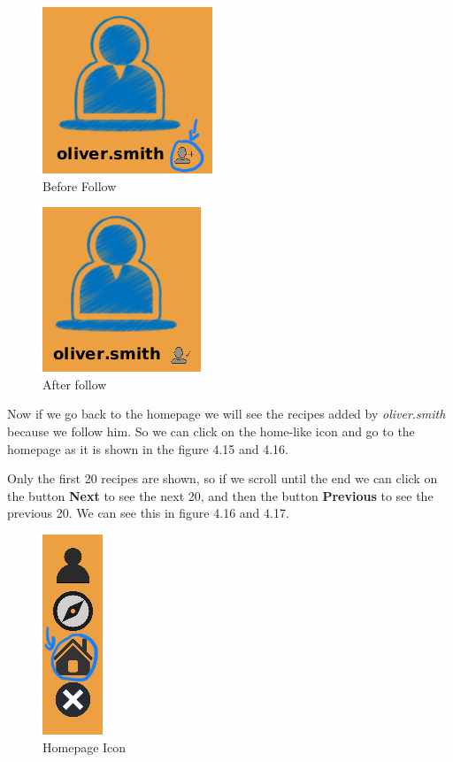 \documentclass[a4paper]{report}
\begin{document}
\begin{figure}[htpb]
	\centering
	\includegraphics[scale=0.6]{img/user_manual/howToFollow.png}
	\caption{Before Follow}
\end{figure}

\begin{figure}[htpb]
	\centering
	\includegraphics[scale=0.6]{img/user_manual/afterfollow.png}
	\caption{After follow}
\end{figure}

\newpage
\noindent Now if we go back to the homepage we will see the recipes added by \emph{oliver.smith} because we follow him. So we can click on the home-like icon and go to the homepage as it is shown in the figure 4.15 and 4.16.

\noindent Only the first 20 recipes are shown, so if we scroll until the end we can click on the button \textbf{Next} to see the next 20, and then the button \textbf{Previous} to see the previous 20. We can see this in figure 4.16 and 4.17.

\begin{figure}[htpb]
	\centering
	\includegraphics[scale=0.6]{img/user_manual/menu.png}
	\caption{Homepage Icon}
\end{figure}
\end{document}
